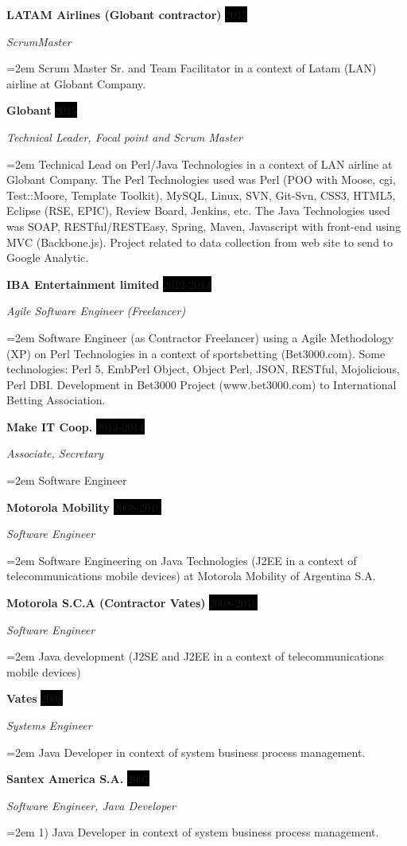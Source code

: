 \documentclass[paper=a4,fontsize=11pt]{scrartcl} %
\newcommand{\sepspace}{\vspace*{1em}}		%
\newcommand{\EducationEntry}[4]{ %
		\noindent \textbf{#1} \hfill      %
		\colorbox{Black}{%
			\parbox{6em}{%
			\hfill\color{White}#2}} \par  %
		\noindent \textit{#3} \par        %
		\noindent\hangindent=2em\hangafter=0 \small #4 %
		\normalsize \par}
\newcommand{\WorkEntry}[4]{				  %
		\noindent \textbf{#1} \hfill      %
		\colorbox{Black}{\color{White}#2} \par  %
		\noindent \textit{#3} \par              %
		\noindent\hangindent=2em\hangafter=0 \small #4 %
		\normalsize \par}
\begin{document}
\sepspace

\WorkEntry{LATAM Airlines (Globant contractor)}{2015}{ScrumMaster}
{Scrum Master Sr. and Team Facilitator in a context of Latam (LAN) airline at Globant Company.}
\sepspace

\WorkEntry{Globant}{2015}{Technical Leader, Focal point and Scrum Master}
{Technical Lead on Perl/Java Technologies in a context of LAN airline at Globant Company. The Perl Technologies used was Perl (POO with Moose, cgi, Test::Moore, Template Toolkit), MySQL, Linux, SVN, Git-Svn, CSS3, HTML5, Eclipse (RSE, EPIC), Review Board, Jenkins, etc. The Java Technologies used was SOAP, RESTful/RESTEasy, Spring, Maven, Javascript with front-end using MVC (Backbone.js). Project related to data collection from web site to send to Google Analytic.}
\sepspace

\WorkEntry{IBA Entertainment limited}{2012-2014}{Agile Software Engineer (Freelancer)}
{Software Engineer (as Contractor Freelancer) using a Agile Methodology (XP) on Perl Technologies in a context of sportsbetting (Bet3000.com). Some technologies: Perl 5, EmbPerl Object, Object Perl, JSON, RESTful, Mojolicious, Perl DBI. Development in Bet3000 Project (www.bet3000.com) to International Betting Association.}
\sepspace

\WorkEntry{Make IT Coop.}{2013-2014}{Associate, Secretary}{
Software Engineer}
\sepspace

\WorkEntry{Motorola Mobility}{2008-2010}{Software Engineer}
{Software Engineering on Java Technologies (J2EE in a context of telecommunications mobile devices) at Motorola Mobility of Argentina S.A.}
\sepspace

\WorkEntry{Motorola S.C.A (Contractor Vates)}{2008-2010}{Software Engineer}
{Java development (J2SE and J2EE in a context of telecommunications mobile devices)}
\sepspace

\WorkEntry{Vates}{2008}{Systems Engineer}
{Java Developer in context of system business process management.}
\sepspace

\WorkEntry{Santex America S.A.}{2007}{Software Engineer, Java Developer}
{1) Java Developer in context of system business process management.}
\sepspace
\end{document}
